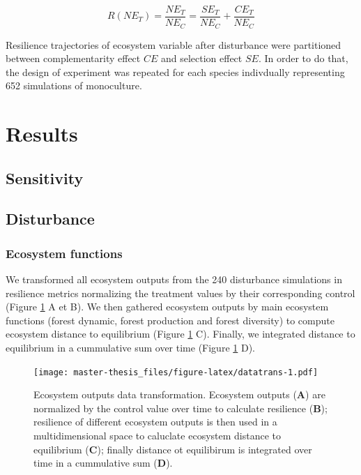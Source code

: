 \documentclass[12pt,]{article}
\let\oldsection\section
\renewcommand\section{\newpage\oldsection}
\theoremstyle{definition}
\theoremstyle{definition}
\theoremstyle{remark}
\begin{document}
\begin{equation}
  R(NE_T) = \frac{NE_T}{NE_C} = \frac{SE_T}{NE_C} + \frac{CE_T}{NE_C}
  \label{eq:RNE}
\end{equation}

Resilience trajectories of ecosystem variable after disturbance were
partitioned between complementarity effect \(CE\) and selection effect
\(SE\). In order to do that, the design of experiment was repeated for
each species indivdually representing 652 simulations of monoculture.

\section{Results}\label{results}

\subsection{Sensitivity}\label{sensitivity}

\subsection{Disturbance}\label{disturbance-1}

\subsubsection{Ecosystem functions}\label{ecosystem-functions-1}

We transformed all ecosystem outputs from the 240 disturbance
simulations in resilience metrics normalizing the treatment values by
their corresponding control (Figure \ref{fig:datatrans} A et B). We then
gathered ecosystem outputs by main ecosystem functions (forest dynamic,
forest production and forest diversity) to compute ecosystem distance to
equilibrium (Figure \ref{fig:datatrans} C). Finally, we integrated
distance to equilibrium in a cummulative sum over time (Figure
\ref{fig:datatrans} D).

\begin{figure}[htbp]
\centering
\texttt{[image: master-thesis\_files/figure-latex/datatrans-1.pdf]}
\caption{\label{fig:datatrans}Ecosystem outputs data transformation.
Ecosystem outputs (\textbf{A}) are normalized by the control value over
time to calculate resilience (\textbf{B}); resilience of different
ecosystem outputs is then used in a multidimensional space to caluclate
ecosystem distance to equilibrium (\textbf{C}); finally distance ot
equilibirum is integrated over time in a cummulative sum (\textbf{D}).}
\end{figure}
\end{document}
